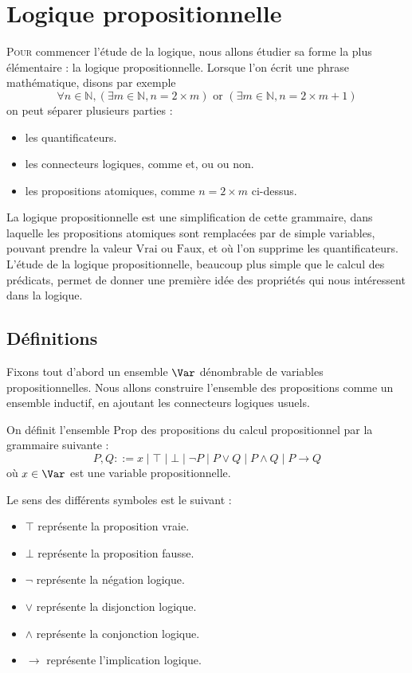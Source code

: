 \chapter{Logique propositionnelle}
\label{chp.logprop}

\lettrine{P}{our} commencer l'étude de la logique, nous allons étudier sa forme
la plus élémentaire : la logique propositionnelle. Lorsque l'on écrit une phrase
mathématique, disons par exemple
\[\forall n \in \mathbb N, (\exists m \in \mathbb N, n = 2\times m) \text{ or }
(\exists m \in \mathbb N, n = 2 \times m + 1)\]
on peut séparer plusieurs parties :
\begin{itemize}
\item les quantificateurs.
\item les connecteurs logiques, comme \og et\fg{}, \og ou\fg{} ou \og non\fg{}.
\item les propositions atomiques, comme $n = 2 \times m$ ci-dessus.
\end{itemize}

La logique propositionnelle est une simplification de cette grammaire, dans
laquelle les propositions atomiques sont remplacées par de simple variables,
pouvant prendre la valeur $\mathrm{Vrai}$ ou $\mathrm{Faux}$, et où l'on
supprime les quantificateurs. L'étude de la logique propositionnelle, beaucoup
plus simple que le calcul des prédicats, permet de donner une première idée des
propriétés qui nous intéressent dans la logique.

\section{Définitions}

Fixons tout d'abord un ensemble $\Var$ dénombrable de variables
propositionnelles. Nous allons construire l'ensemble des propositions comme un
ensemble inductif, en ajoutant les connecteurs logiques usuels.

\begin{definition}[Propositions]
  On définit l'ensemble $\mathrm{Prop}$ des propositions du calcul
  propositionnel par la grammaire suivante :
  \[P,Q ::= x \mid \top \mid \bot \mid \lnot P \mid P \lor Q \mid P \land Q
  \mid P \to Q\]
  où $x\in \Var$ est une variable propositionnelle.
\end{definition}

Le sens des différents symboles est le suivant :
\begin{itemize}
\item $\top$ représente la proposition vraie.
\item $\bot$ représente la proposition fausse.
\item $\lnot$ représente la négation logique.
\item $\lor$ représente la disjonction logique.
\item $\land$ représente la conjonction logique.
\item $\to$ représente l'implication logique.
\end{itemize}

